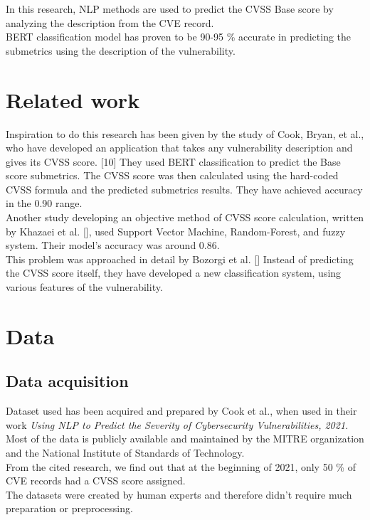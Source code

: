 \documentclass[times, utf8, zavrsni, english]{fer}
\begin{document}
In this research, NLP methods are used to predict the CVSS Base score by analyzing the description from the CVE record. \\
BERT classification model has proven to be 90-95 \% accurate in predicting the submetrics using the description of the vulnerability.

\chapter{Related work}
Inspiration to do this research has been given by the study of Cook, Bryan, et al., who have developed an application that takes any vulnerability description and gives its CVSS score. [10] They used BERT classification to predict the Base score submetrics. The CVSS score was then calculated using the hard-coded CVSS formula and the predicted submetrics results. They have achieved accuracy in the 0.90 range. \\

Another study developing an objective method of CVSS score calculation, written by Khazaei et al. [], used Support Vector Machine, Random-Forest, and fuzzy system. Their model's accuracy was around 0.86. \\

This problem was approached in detail by Bozorgi et al. [] Instead of predicting the CVSS score itself, they have developed a new classification system, using various features of the vulnerability. \\

\chapter{Data}
\section{Data acquisition}
Dataset used has been acquired and prepared by Cook et al., when used in their work \emph{Using NLP to Predict the Severity of Cybersecurity Vulnerabilities, 2021.}
Most of the data is publicly available and maintained by the MITRE organization and the National Institute of Standards of Technology. \\
From the cited research, we find out that at the beginning of 2021, only 50 \% of CVE records had a CVSS score assigned. \\
The datasets were created by human experts and therefore didn't require much preparation or preprocessing. 
\end{document}
